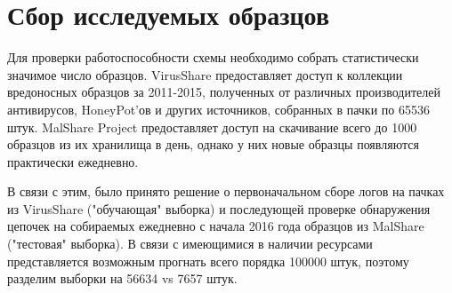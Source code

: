 \section {Сбор исследуемых образцов}
Для проверки работоспособности схемы необходимо собрать статистически значимое число образцов. 
VirusShare \cite{VIRUSSHARE} предоставляет доступ к коллекции вредоносных образцов за 2011-2015, полученных от различных производителей антивирусов, HoneyPot'ов и других источников, собранных в пачки по 65536 штук.
MalShare Project \cite{MALSHARE} предоставляет доступ на скачивание  всего до 1000 образцов из их хранилища в день, однако у них новые образцы появляются практически ежедневно.

В связи с этим, было принято решение о первоначальном сборе логов на пачках из VirusShare ("обучающая" выборка) и последующей проверке обнаружения цепочек на собираемых ежедневно с начала 2016 года образцов из MalShare ("тестовая" выборка). В связи с имеющимися в наличии ресурсами представляется возможным прогнать всего порядка 100000 штук, поэтому разделим выборки на 56634 vs 7657 штук.
